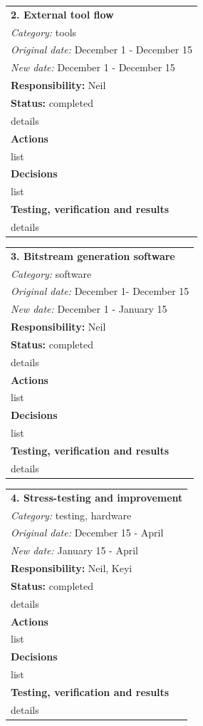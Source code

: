 \documentclass[12pt,letterpaper]{article}
\begin{document}
\begin{tabular}{|p{6in}|}
\hline
\textbf{2. External tool flow} \\
\emph{Category:} tools \\
\emph{Original date:} December 1 - December 15 \\
\emph{New date:} December 1 - December 15 \\
\hline
\textbf{Responsibility:} Neil \\
\hline
\textbf{Status:} completed \\
details \\
\hline
\textbf{Actions} \\
list \\
\hline
\textbf{Decisions} \\
list \\
\hline
\textbf{Testing, verification and results} \\
details \\
\hline
\end{tabular}


\begin{tabular}{|p{6in}|}
\hline
\textbf{3. Bitstream generation software} \\
\emph{Category:} software \\
\emph{Original date:} December 1- December 15 \\
\emph{New date:} December 1 - January 15 \\
\hline
\textbf{Responsibility:} Neil \\
\hline
\textbf{Status:} completed \\
details \\
\hline
\textbf{Actions} \\
list \\
\hline
\textbf{Decisions} \\
list \\
\hline
\textbf{Testing, verification and results} \\
details \\
\hline
\end{tabular}


\begin{tabular}{|p{6in}|}
\hline
\textbf{4. Stress-testing and improvement} \\
\emph{Category:} testing, hardware \\
\emph{Original date:} December 15 - April \\
\emph{New date:} January 15 - April \\
\hline
\textbf{Responsibility:} Neil, Keyi \\
\hline
\textbf{Status:} completed \\
details \\
\hline
\textbf{Actions} \\
list \\
\hline
\textbf{Decisions} \\
list \\
\hline
\textbf{Testing, verification and results} \\
details \\
\hline
\end{tabular}
\end{document}
